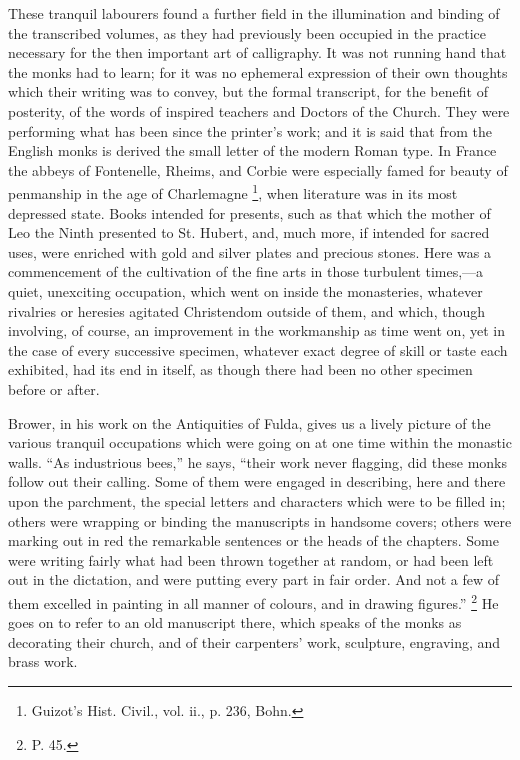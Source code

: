 These tranquil labourers found a further field in the illumination
and binding of the transcribed volumes, as they had previously been
occupied in the practice necessary for the then important art of
calligraphy. It was not running hand that the monks had to learn; for
it was no ephemeral expression of their own thoughts which their
writing was to convey, but the formal transcript, for the benefit of
posterity, of the words of inspired teachers and Doctors of the
Church. They were performing what has been since the printer's work;
and it is said that from the English monks is derived the small letter
of the modern Roman type. In France the abbeys of Fontenelle, Rheims,
and Corbie were especially famed for beauty of penmanship in the age
of Charlemagne \footnote{Guizot's Hist.
Civil., vol. ii., p. 236, Bohn.}, when
literature was in its most depressed state. Books intended for
presents, such as that which the mother of Leo the Ninth presented to
St. Hubert, and, much more, if intended for sacred uses, were enriched
with gold and silver plates and precious stones. Here was a
commencement of the cultivation of the fine arts in those turbulent
times,—a quiet, unexciting occupation, which went on inside the
monasteries, whatever rivalries or heresies agitated Christendom
outside of them, and which, though involving, of course, an
improvement in the workmanship as time went on, yet in the case of
every successive specimen, whatever exact degree of skill or taste
each exhibited, had its end in itself, as though there had been no
other specimen before or after.

Brower, in his work on the Antiquities of Fulda, gives us a lively
picture of the various tranquil occupations which were going on at one
time within the monastic walls. ``As industrious bees,'' he
says, ``their work never flagging, did these monks follow out
their calling. Some of them were engaged in describing, here and there
upon the parchment, the special letters and characters which were to
be filled in; others were wrapping or binding the manuscripts in
handsome covers; others were marking out in red the remarkable
sentences or the heads of the chapters. Some were writing fairly what
had been thrown together at random, or had been left out in the
dictation, and were putting every part in fair order. And not a few of
them excelled in painting in all manner of colours, and in drawing
figures.'' \footnote{P. 45.} He goes
on to refer to an old manuscript there, which speaks of the monks as
decorating their church, and of their carpenters' work, sculpture,
engraving, and brass work.

